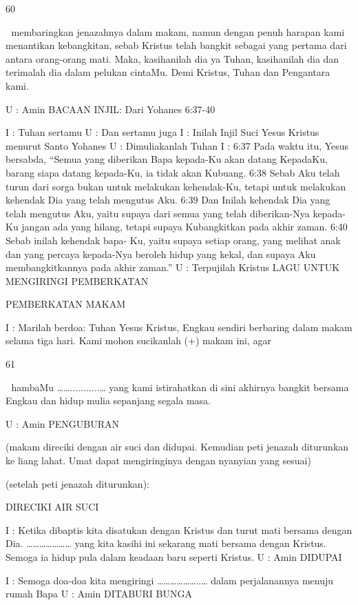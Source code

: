 \documentclass[10pt,a5paper,fancyhdr]{memoir}
\begin{document}
60 



membaringkan jenazahnya dalam makam, namun dengan penuh 
harapan kami menantikan kebangkitan, sebab Kristus telah bangkit 
sebagai yang pertama dari antara orang-orang mati. Maka, 
kasihanilah dia ya Tuhan, kasihanilah dia dan terimalah dia dalam 
pelukan cintaMu. Demi Kristus, Tuhan dan Pengantara kami. 

U : Amin 
BACAAN INJIL: Dari Yohanes 6:37-40 

I : Tuhan sertamu 
U : Dan sertamu juga 
I : Inilah Injil Suci Yesus Kristus menurut Santo Yohanes 
U : Dimuliakanlah Tuhan 
I : 6:37 Pada waktu itu, Yesus bersabda, “Semua yang diberikan 
Bapa kepada-Ku akan datang KepadaKu, barang siapa datang 
kepada-Ku, ia tidak akan Kubuang. 6:38 Sebab Aku telah turun dari 
sorga bukan untuk melakukan kehendak-Ku, tetapi untuk melakukan 
kehendak Dia yang telah mengutus Aku. 6:39 Dan Inilah kehendak 
Dia yang telah mengutus Aku, yaitu supaya dari semua yang telah 
diberikan-Nya kepada-Ku jangan ada yang hilang, tetapi supaya 
Kubangkitkan pada akhir zaman. 6:40 Sebab inilah kehendak bapa-
Ku, yaitu supaya setiap orang, yang melihat anak dan yang percaya 
kepada-Nya beroleh hidup yang kekal, dan supaya Aku 
membangkitkannya pada akhir zaman.” 
U : Terpujilah Kristus 
LAGU UNTUK MENGIRINGI PEMBERKATAN 

PEMBERKATAN MAKAM 

I : Marilah berdoa: 
Tuhan Yesus Kristus, Engkau sendiri berbaring dalam makam 
selama tiga hari. Kami mohon sucikanlah (+) makam ini, agar 

61 



hambaMu ……...........… yang kami istirahatkan di sini akhirnya 
bangkit bersama Engkau dan hidup mulia sepanjang segala masa. 

U : Amin 
PENGUBURAN 

(makam direciki dengan air suci dan didupai. Kemudian peti jenazah 
diturunkan ke liang lahat. Umat dapat mengiringinya dengan 
nyanyian yang sesuai) 

(setelah peti jenazah diturunkan): 

DIRECIKI AIR SUCI 

I : Ketika dibaptis kita disatukan dengan Kristus dan turut mati 
bersama dengan Dia. ………………… yang kita kasihi ini sekarang 
mati bersama dengan Kristus. Semoga ia hidup pula dalam keadaan 
baru seperti Kristus. 
U : Amin 
DIDUPAI 

I : Semoga doa-doa kita mengiringi ………………..… dalam 
perjalanannya menuju rumah Bapa 
U : Amin 
DITABURI BUNGA 
\end{document}
